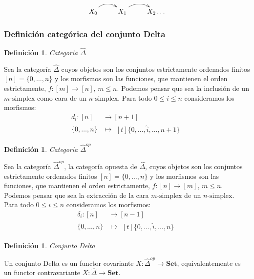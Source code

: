 \documentclass[11pt,a4paper,openright,oneside]{article}
\numberwithin{equation}{section}
\newtheorem{defi}[teo]{Definici\'on}
\theoremstyle{definition}
\begin{document}
$$ %
    \xymatrix{
    X_0  \ar@/{}^{1pc}/[r]  & X_1  \ar@/{}^{1pc}/[r] & X_2  \dots
    }
$$

\subsubsection{Definici\'on categ\'orica del conjunto Delta}
\begin{defi}
    Categor\'ia $\hat{\Delta}$
\end{defi}
Sea la categor\'ia $\hat{\Delta}$ cuyos objetos son los conjuntos estrictamente ordenados finitos $[n] = \{0,\dots,n\}$ y los morfismos son las funciones, que mantienen el orden estrictamente, $f: [m] \longrightarrow [n]$, $m\le n$. Podemos pensar que sea la inclusi\'on de un $m\text{-simplex}$ como cara de un $n\text{-simplex}$.
Para todo $0\le i \le n$ consideramos los morfismos:
\begin{align*}
    d_i: [n]      & \longrightarrow [n+1] \\
    \{0,\dots,n\} & \longmapsto\!
    \begin{aligned}[t]
        \{0,\dots, \hat{i}, \dots,n+1\}
    \end{aligned}
\end{align*}

\begin{defi}
    Categor\'ia $\hat{\Delta}^{op}$
\end{defi}
Sea la categor\'ia $\hat{\Delta}^{op}$, la categor\'ia opuesta de $\hat{\Delta}$, cuyos objetos son los conjuntos estrictamente ordenados finitos $[n] = \{0,\dots,n\}$ y los morfismos son las funciones, que mantienen el orden estrictamente, $f: [n] \longrightarrow [m]$, $m\le n$. Podemos pensar que sea la extracci\'on de la cara $m\text{-simplex}$ de un $n\text{-simplex}$.
Para todo $0\le i \le n$ consideramos los morfismos:
\begin{align*}
    \delta_i: [n] & \longrightarrow [n-1] \\
    \{0,\dots,n\} & \longmapsto\!
    \begin{aligned}[t]
        \{0,\dots, \hat{i}, \dots,n\}
    \end{aligned}
\end{align*}

\begin{defi}
    Conjunto Delta
\end{defi}
Un conjunto Delta es un functor covariante $X: \hat{\Delta}^{op} \longrightarrow \mathbf{Set}$, equivalentemente es un functor contravariante $X: \hat{\Delta} \longrightarrow \mathbf{Set}$.
\end{document}
